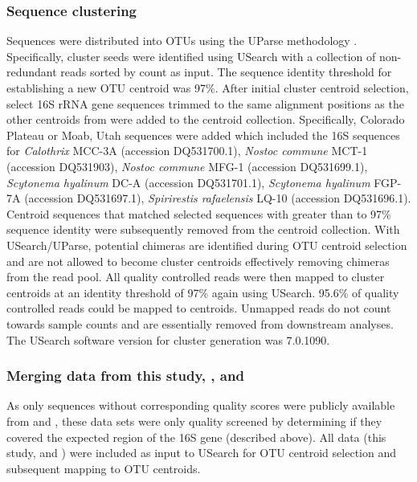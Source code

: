 \subsubsection{Sequence clustering}
Sequences were distributed into OTUs using the UParse methodology
\citep{23955772}. Specifically, cluster seeds were identified using USearch with
a collection of non-redundant reads sorted by count as input. The sequence
identity threshold for establishing a new OTU centroid was 97\%. After initial
cluster centroid selection, select 16S rRNA gene sequences trimmed to the same
alignment positions as the other centroids from \citet{Yeager} were added to
the centroid collection. Specifically, \citet{Yeager} Colorado Plateau or Moab,
Utah sequences were added which included the 16S sequences for
\textit{Calothrix} MCC-3A (accession DQ531700.1), \textit{Nostoc commune}
MCT-1 (accession DQ531903), \textit{Nostoc commune} MFG-1 (accession
DQ531699.1), \textit{Scytonema hyalinum} DC-A (accession DQ531701.1),
\textit{Scytonema hyalinum} FGP-7A (accession DQ531697.1), \textit{Spirirestis
rafaelensis} LQ-10 (accession DQ531696.1).  Centroid sequences that matched
selected \citet{Yeager} sequences with greater than to 97\% sequence identity
were subsequently removed from the centroid collection. With USearch/UParse,
potential chimeras are identified during OTU centroid selection and are not
allowed to become cluster centroids effectively removing chimeras from the read
pool. All quality controlled reads were then mapped to cluster centroids at an
identity threshold of 97\% again using USearch. 95.6\% of quality controlled
reads could be mapped to centroids. Unmapped reads do not count towards sample
counts and are essentially removed from downstream analyses. The USearch
software version for cluster generation was 7.0.1090.
\subsubsection{Merging data from this study, \citet{Garcia_Pichel_2013}, and
\citet{Steven_2013}} As only sequences without corresponding quality scores
were publicly available from \citet{Garcia_Pichel_2013} and
\citet{Steven_2013}, these data sets were only quality screened by determining
if they covered the expected region of the 16S gene (described above). All data
(this study, \citet{Garcia_Pichel_2013} and \citet{Steven_2013}) were included
as input to USearch for OTU centroid selection and subsequent mapping to OTU
centroids. 

